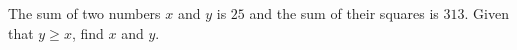 \begin{frame}
\begin{example}
The sum of two numbers $x$ and $y$ is $25$ and the sum of their squares is $313$. Given that $y\geq x$, find $x$ and $y$.

\end{example}
\end{frame}